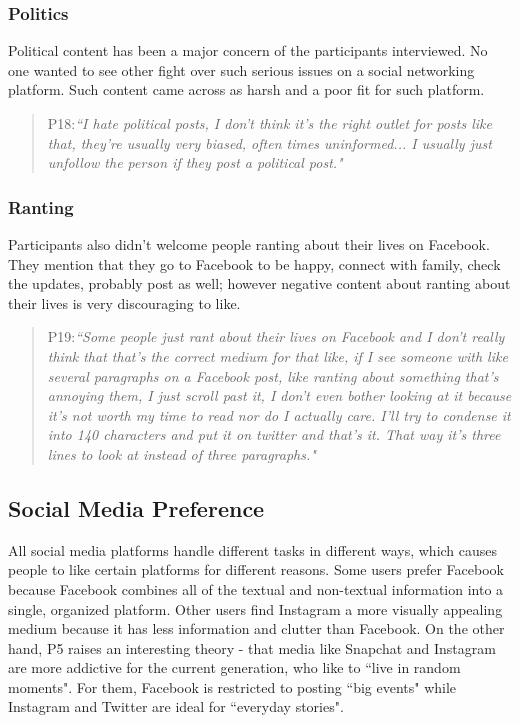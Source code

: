 \subsubsection{Politics}
Political content has been a major concern of the participants interviewed. No one wanted to see other fight over such serious issues on a social networking platform. Such content came across as harsh and a poor fit for such platform.
\begin{quote}
P18:\textit{``I hate political posts, I don't think it's the right outlet for posts like that, they're usually very biased, often times uninformed... I usually just unfollow the person if they post a political post."}
\end{quote}

\subsubsection{Ranting}
Participants also didn't welcome people ranting about their lives on Facebook. They mention that they go to Facebook to be happy, connect with family, check the updates, probably post as well; however negative content about ranting about their lives is very discouraging to like.
\begin{quote}
P19:\textit{``Some people just rant about their lives on Facebook and I don't really think that that's the correct medium for that like, if I see someone with like several paragraphs on a Facebook post, like ranting about something that's annoying them, I just scroll past it, I don't even bother looking at it because it's not worth my time to read nor do I actually care. I'll try to condense it into 140 characters and put it on twitter and that's it. That way it's three lines to look at instead of three paragraphs."}
\end{quote}

\subsection{Social Media Preference}
All social media platforms handle different tasks in different ways, which causes people to like certain platforms for different reasons. Some users prefer Facebook because Facebook combines all of the textual and non-textual information into a single, organized platform. Other users find Instagram a more visually appealing medium because it has less information and clutter than Facebook. On the other hand, P5 raises an interesting theory - that media like Snapchat and Instagram are more addictive for the current generation, who like to ``live in random moments". For them, Facebook is restricted to posting ``big events" while Instagram and Twitter are ideal for ``everyday stories".

